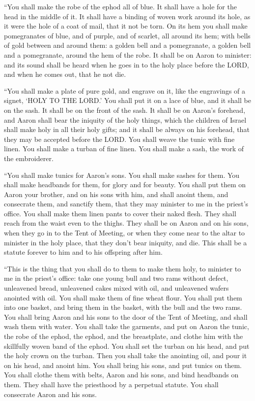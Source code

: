 \myverse{}“You shall make the robe of the ephod all of blue.
\myverse{}It shall have a hole for the head in the middle of it. It shall have a binding
of woven work around its hole, as it were the hole of a coat of mail, that it not be torn.
\myverse{}On its hem you shall make pomegranates of blue, and of purple, and of scarlet,
all around its hem; with bells of gold between and around them:
\myverse{}a golden bell and a pomegranate, a golden bell and a pomegranate, around
the hem of the robe.
\myverse{}It shall be on Aaron to minister: and its sound shall be heard when he goes
in to the holy place before the LORD, and when he comes out, that he not die.


\myverse{}“You shall make a plate of pure gold, and engrave on it, like
the engravings of a signet, ‘HOLY TO THE LORD.’
\myverse{}You shall put it on a lace of blue, and it shall be on the sash. It shall
be on the front of the sash.
\myverse{}It shall be on Aaron’s forehead, and Aaron shall bear the iniquity of the
holy things, which the children of Israel shall make holy in all their holy gifts; and it shall be always
on his forehead, that they may be accepted before the LORD.
\myverse{}You shall weave the tunic with fine linen. You shall make a turban of fine
linen. You shall make a sash, the work of the embroiderer.


\myverse{}“You shall make tunics for Aaron’s sons. You shall make sashes
for them. You shall make headbands for them, for glory and for beauty.
\myverse{}You shall put them on Aaron your brother, and on his sons with him, and shall
anoint them, and consecrate them, and sanctify them, that they may minister to me in the priest’s office.
\myverse{}You shall make them linen pants to cover their naked flesh. They shall reach
from the waist even to the thighs.
\myverse{}They shall be on Aaron and on his sons, when they go in to the Tent of Meeting,
or when they come near to the altar to minister in the holy place, that they don’t bear iniquity, and
die. This shall be a statute forever to him and to his offspring after him.

\mychapter{} \myverse*{}“This is the thing that you shall do to them to make them holy,
to minister to me in the priest’s office: take one young bull and two rams without defect,
\myverse{}unleavened bread, unleavened cakes mixed with oil, and unleavened wafers anointed
with oil. You shall make them of fine wheat flour.
\myverse{}You shall put them into one basket, and bring them in the basket, with the
bull and the two rams.
\myverse{}You shall bring Aaron and his sons to the door of the Tent of Meeting, and
shall wash them with water.
\myverse{}You shall take the garments, and put on Aaron the tunic, the robe of the ephod,
the ephod, and the breastplate, and clothe him with the skillfully woven band of the ephod.
\myverse{}You shall set the turban on his head, and put the holy crown on the turban.
\myverse{}Then you shall take the anointing oil, and pour it on his head, and anoint
him.
\myverse{}You shall bring his sons, and put tunics on them.
\myverse{}You shall clothe them with belts, Aaron and his sons, and bind headbands on
them. They shall have the priesthood by a perpetual statute. You shall consecrate Aaron and his sons.


